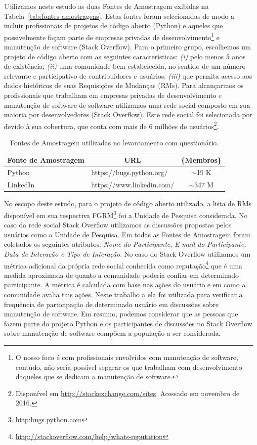 Utilizamos neste estudo as duas Fontes de Amostragem exibidas na
Tabela~\ref{tab:fontes-amostragens}. Estas fontes foram selecionadas de modo a
incluir profissionais de projetos de código aberto (Python) e aqueles que
possivelmente façam parte de empresas privadas de desenvolvimento\footnote{O
	nosso foco é com profissionais envolvidos com manutenção de software,
	contudo, não seria possível separar os que trabalham com desenvolvimento
	daqueles que se dedicam a manutenção de software.} e manutenção de software
(Stack Overflow). Para o primeiro grupo, escolhemos um projeto de código aberto
com as seguintes características: \textit{(i)} pelo menos 5 anos de existência;
\textit{(ii)} uma comunidade bem estabelecida, no sentido de um número relevante
e participativo de contribuidores e usuários; \textit{(iii)} que permita acesso
aos dados históricos de suas Requisições de Mudanças (RMs).  Para alcançarmos os
profissionais que trabalham em empresas privadas de desenvolvimento e manutenção
de software de software utilizamos uma rede social composto em sua maioria por
desenvolvedores (Stack Overflow). Este rede social foi selecionada por devido à
sua cobertura, que conta com mais de 6 milhões de usuários\footnote{Disponível
	em \url{http://stackexchange.com/sites}. Acessado em novembro de 2016.}.

\begin{table}[htpb]
\centering
\begin{tabular}{@{}llc@{}}
\toprule
\multicolumn{1}{c}{Fonte de Amostragem} & \multicolumn{1}{c}{URL} & \textbf\{Membros\} \\ 
\midrule
Python & https://bugs.python.org/ & $\sim$19 K \\
LinkedIn & https://www.linkedin.com/ & $\sim$347 M \\
\bottomrule
\end{tabular}%
\caption{Fontes de Amostragem utilizadas no levantamento com questionário.}
\label{tb:fonte-amostragens}
\end{table}

No escopo deste estudo, para o projeto de código aberto utilizado, a lista de
RMs disponível em sua respectiva FGRM\footnote{\url{http:bugs.python.com}} foi a
Unidade de Pesquisa considerada. No caso da rede social Stack Overflow
utilizamos as discussões propostas pelos usuários como a Unidade de Pesquisa. Em
todas as Fontes de Amostragem foram coletados os seguintes atributos:
\textit{Nome do Participante, E-mail do Participante, Data de Interação e Tipo
	de Interação}. No caso do Stack Overflow utilizamos um métrica adicional da
própria rede social conhecida como
reputação\footnote{\url{http://stackoverflow.com/help/whats-reputation}} que é
uma medida aproximada de quanto a comunidade poderia confiar em determinado
participante. A métrica é calculada com base nas ações do usuário e em como a
comunidade avalia tais ações. Neste trabalho a ela foi utilizada para verificar
a frequência de participação de determinado usuário em discussões sobre
manutenção de software. Em resumo, podemos considerar que as pessoas que fazem
parte do projeto Python e os participantes de discussões no Stack Overflow sobre
manutenção de software compõem a população a ser considerada.


